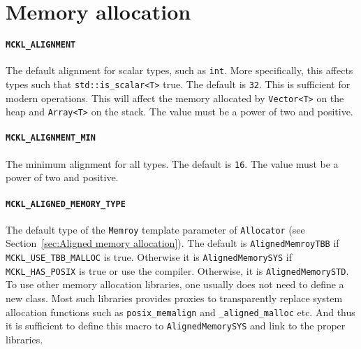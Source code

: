 \section{Memory allocation}
\label{sec:Memory allocation}

\paragraph{\texttt{MCKL\_ALIGNMENT}} The default alignment for scalar types,
such as \verb|int|. More specifically, this affects types such that
\verb|std::is_scalar<T>| true. The default is \verb|32|. This is sufficient for
modern \simd operations. This will affect the memory allocated by
\verb|Vector<T>| on the heap and \verb|Array<T>| on the stack. The value must
be a power of two and positive.

\paragraph{\texttt{MCKL\_ALIGNMENT\_MIN}} The minimum alignment for all types.
The default is \verb|16|. The value must be a power of two and positive.

\paragraph{\texttt{MCKL\_ALIGNED\_MEMORY\_TYPE}} The default type of the
\verb|Memroy| template parameter of \verb|Allocator| (see
Section~\ref{sec:Aligned memory allocation}). The default is
\verb|AlignedMemroyTBB| if \verb|MCKL_USE_TBB_MALLOC| is true. Otherwise it is
\verb|AlignedMemorySYS| if \verb|MCKL_HAS_POSIX| is true or use the \msvc
compiler. Otherwise, it is \verb|AlignedMemorySTD|. To use other memory
allocation libraries, one usually does not need to define a new class. Most
such libraries provides proxies to transparently replace system allocation
functions such as \verb|posix_memalign| and \verb|_aligned_malloc| etc. And
thus it is sufficient to define this macro to \verb|AlignedMemorySYS| and link
to the proper libraries.


